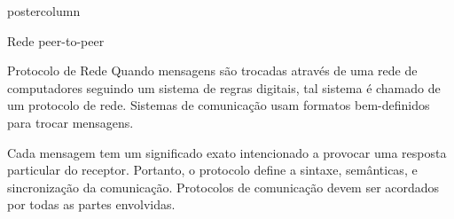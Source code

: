 \documentclass[final]{beamer}
\begin{document}
\begin{frame}
\begin{columns}
\begin{column}{.5\textwidth}
\begin{beamercolorbox}[center,wd=\textwidth]{postercolumn}
\begin{minipage}[T]{.95\textwidth}
{            \begin{block}{Rede peer-to-peer}
                \center 
                                
                \vspace*{0.2cm}
            \end{block}
            
            \vspace*{0.2cm}

            \begin{block}{Protocolo de Rede}
            \justifying
                Quando mensagens são trocadas através de uma rede de computadores seguindo um sistema de regras digitais,
                tal sistema é chamado de um protocolo de rede. Sistemas de comunicação usam formatos bem-definidos para
                trocar mensagens. 
                
                \vspace*{0.4cm} 
                
                
                \vspace*{0.2cm} 
                
                Cada mensagem tem um significado exato intencionado a provocar uma resposta particular
                do receptor. Portanto, o protocolo define a sintaxe, semânticas, e sincronização da comunicação. Protocolos
                de comunicação devem ser acordados por todas as partes envolvidas.
                               
                \vspace*{0.2cm} 
            \end{block}
          }
        \end{minipage}
      \end{beamercolorbox}
    \end{column}


\end{columns}
\end{frame}
\end{document}
